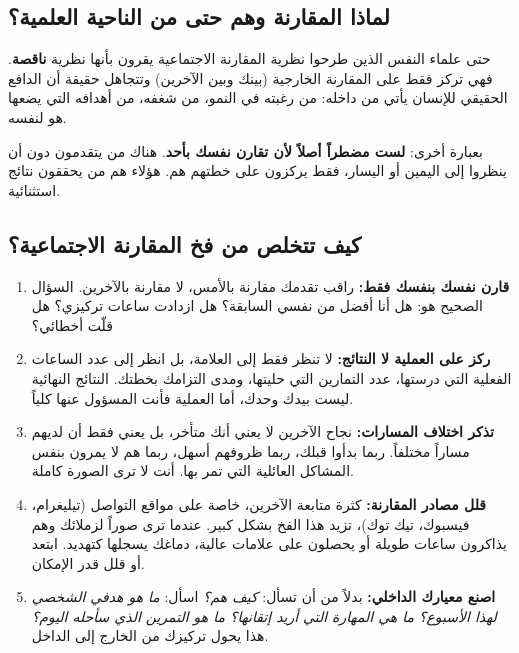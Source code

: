 \documentclass[12pt,a4paper]{book}
\begin{document}
	\subsection{لماذا المقارنة وهم حتى من الناحية العلمية؟}
	
	حتى علماء النفس الذين طرحوا نظرية المقارنة الاجتماعية يقرون بأنها نظرية \textbf{ناقصة}. فهي تركز فقط على المقارنة الخارجية (بينك وبين الآخرين) وتتجاهل حقيقة أن الدافع الحقيقي للإنسان يأتي من داخله: من رغبته في النمو، من شغفه، من أهدافه التي يضعها هو لنفسه.
	
	بعبارة أخرى: \textbf{لست مضطراً أصلاً لأن تقارن نفسك بأحد}. هناك من يتقدمون دون أن ينظروا إلى اليمين أو اليسار، فقط يركزون على خطتهم هم. هؤلاء هم من يحققون نتائج استثنائية.
	
	\subsection{كيف تتخلص من فخ المقارنة الاجتماعية؟}
	
	\begin{enumerate}
		\item \textbf{قارن نفسك بنفسك فقط:} راقب تقدمك مقارنة بالأمس، لا مقارنة بالآخرين. السؤال الصحيح هو: هل أنا أفضل من نفسي السابقة؟ هل ازدادت ساعات تركيزي؟ هل قلّت أخطائي؟
		
		\item \textbf{ركز على العملية لا النتائج:} لا تنظر فقط إلى العلامة، بل انظر إلى عدد الساعات الفعلية التي درستها، عدد التمارين التي حليتها، ومدى التزامك بخطتك. النتائج النهائية ليست بيدك وحدك، أما العملية فأنت المسؤول عنها كلياً.
		
		\item \textbf{تذكر اختلاف المسارات:} نجاح الآخرين لا يعني أنك متأخر، بل يعني فقط أن لديهم مساراً مختلفاً. ربما بدأوا قبلك، ربما ظروفهم أسهل، ربما هم لا يمرون بنفس المشاكل العائلية التي تمر بها. أنت لا ترى الصورة كاملة.
		
		\item \textbf{قلل مصادر المقارنة:} كثرة متابعة الآخرين، خاصة على مواقع التواصل (تيليغرام، فيسبوك، تيك توك)، تزيد هذا الفخ بشكل كبير. عندما ترى صوراً لزملائك وهم يذاكرون ساعات طويلة أو يحصلون على علامات عالية، دماغك يسجلها كتهديد. ابتعد أو قلل قدر الإمكان.
		
		\item \textbf{اصنع معيارك الداخلي:} بدلاً من أن تسأل: \textit{كيف هم؟} اسأل: \textit{ما هو هدفي الشخصي لهذا الأسبوع؟ ما هي المهارة التي أريد إتقانها؟ ما هو التمرين الذي سأحله اليوم؟} هذا يحول تركيزك من الخارج إلى الداخل.
	\end{enumerate}
	
\end{document}
